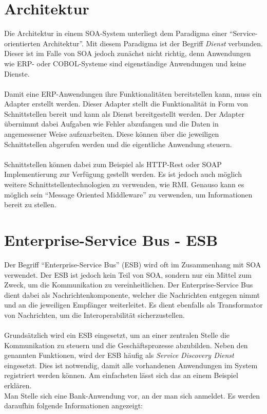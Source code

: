 \section{Architektur}
\label{sec:SoaArchitektur}
Die Architektur in einem SOA-System unterliegt dem Paradigma einer "`Service-orientierten Architektur"'. Mit diesem Paradigma ist der Begriff \textit{Dienst} verbunden. Dieser ist im Falle von SOA jedoch zunächst nicht richtig, denn Anwendungen wie ERP- oder COBOL-Systeme sind eigenständige Anwendungen und keine Dienste.
\\\\
Damit eine ERP-Anwendungen ihre Funktionalitäten bereitstellen kann, muss ein Adapter erstellt werden. Dieser Adapter stellt die Funktionalität in Form von Schnittstellen bereit und kann als Dienst bereitgestellt werden. Der Adapter übernimmt dabei Aufgaben wie Fehler abzufangen und die Daten in angemessener Weise aufzuarbeiten. Diese können über die jeweiligen Schnittstellen abgerufen werden und die eigentliche Anwendung steuern.
\\\\
Schnittstellen können dabei zum Beispiel als HTTP-Rest oder SOAP Implementierung zur Verfügung gestellt werden. Es ist jedoch auch möglich weitere Schnittstellentechnologien zu verwenden, wie RMI. Genauso kann es möglich sein "`Message Oriented Middleware"' zu verwenden, um Informationen bereit zu stellen.

\section{Enterprise-Service Bus - ESB}
\label{sec:esb}
Der Begriff "`Enterprise-Service Bus"' (ESB) wird oft im Zusammenhang mit SOA verwendet. Der ESB ist jedoch kein Teil von SOA, sondern nur ein Mittel zum Zweck, um die Kommunikation zu vereinheitlichen. Der Enterprise-Service Bus dient dabei als Nachrichtenkomponente, welcher die Nachrichten entgegen nimmt und an die jeweiligen Empfänger weiterleitet. Es dient ebenfalls als Transformator von Nachrichten, um die Interoperabilität sicherzustellen.
\\\\
Grundsätzlich wird ein ESB eingesetzt, um an einer zentralen Stelle die Kommunikation zu steuern und die Geschäftsprozesse abzubilden. Neben den genannten Funktionen, wird der ESB häufig als \textit{Service Discovery Dienst} eingesetzt. Dies ist notwendig, damit alle vorhandenen Anwendungen im System registriert werden können. Am einfachsten lässt sich das an einem Beispiel erklären.
\\
Man Stelle sich eine Bank-Anwendung vor, an der man sich anmeldet. Es werden daraufhin folgende Informationen angezeigt:


